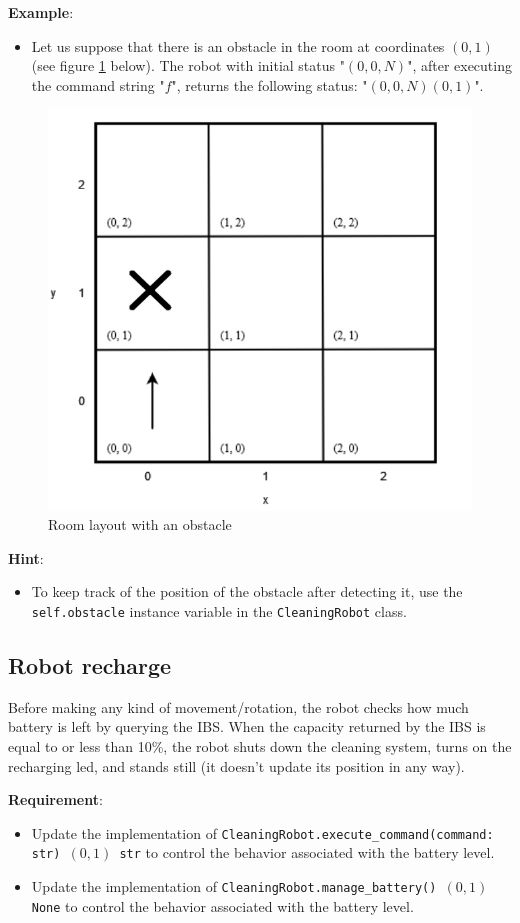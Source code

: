 \noindent\textbf{Example}:
\begin{itemize}
    \item Let us suppose that there is an obstacle in the room at coordinates $(0,1)$ (see figure \ref{room_obstacle} below). The robot with initial status "$(0,0,N)$", after executing the command string "$f$", returns the following status: "$(0,0,N)(0,1)$".
\end{itemize}

\begin{figure}[H]
    \centering
    \includegraphics[width=0.5\linewidth]{figures/appendix/cleaning_robot_2.png}
    \caption{Room layout with an obstacle}
    \label{room_obstacle}
\end{figure}

\noindent\textbf{Hint}:
\begin{itemize}
    \item To keep track of the position of the obstacle after detecting it, use the \texttt{self.obstacle} instance variable in the \texttt{CleaningRobot} class.
\end{itemize}


\subsection{Robot recharge}
Before making any kind of movement/rotation, the robot checks how much battery is left by querying the IBS. When the capacity returned by the IBS is equal to or less than 10\%, the robot shuts down the cleaning system, turns on the recharging led, and stands still (\ie it doesn't update its position in any way).

\noindent\textbf{Requirement}:
\begin{itemize}
    \item Update the implementation of \texttt{CleaningRobot.execute\_command(command: str) $(0,1)$ str} to control the behavior associated with the battery level.
    \item Update the implementation of  \texttt{CleaningRobot.manage\_battery() $(0,1)$ None} to control the behavior associated with the battery level.
\end{itemize}
